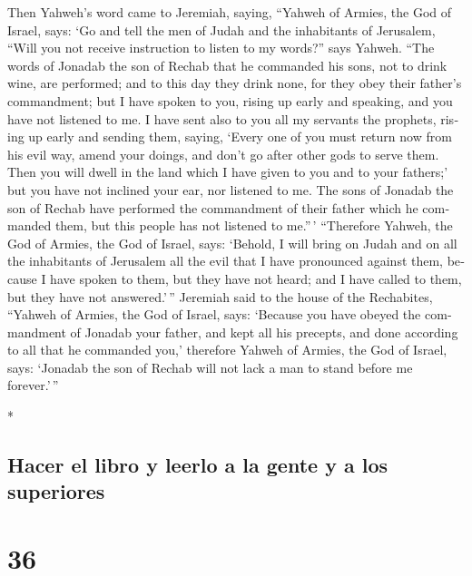 \begin{paracol}{2}
\begin{otherlanguage}{english}
 Then Yahweh's word came to Jeremiah, saying,
 ``Yahweh of Armies, the God of Israel, says: `Go and
tell the men of Judah and the inhabitants of Jerusalem, ``Will you not
receive instruction to listen to my words?'' says Yahweh.
 ``The words of Jonadab the son of Rechab that he
commanded his sons, not to drink wine, are performed; and to this day
they drink none, for they obey their father's commandment; but I have
spoken to you, rising up early and speaking, and you have not listened
to me.  I have sent also to you all my servants the
prophets, rising up early and sending them, saying, `Every one of you
must return now from his evil way, amend your doings, and don't go after
other gods to serve them. Then you will dwell in the land which I have
given to you and to your fathers;' but you have not inclined your ear,
nor listened to me.  The sons of Jonadab the son of
Rechab have performed the commandment of their father which he commanded
them, but this people has not listened to me.''\,' 
``Therefore Yahweh, the God of Armies, the God of Israel, says: `Behold,
I will bring on Judah and on all the inhabitants of Jerusalem all the
evil that I have pronounced against them, because I have spoken to them,
but they have not heard; and I have called to them, but they have not
answered.'\,''  Jeremiah said to the house of the
Rechabites, ``Yahweh of Armies, the God of Israel, says: `Because you
have obeyed the commandment of Jonadab your father, and kept all his
precepts, and done according to all that he commanded you,'
 therefore Yahweh of Armies, the God of Israel, says:
`Jonadab the son of Rechab will not lack a man to stand before me
forever.'\,''

\end{otherlanguage}

\switchcolumn[0]*

\hypertarget{hacer-el-libro-y-leerlo-a-la-gente-y-a-los-superiores}{%
\subsection{Hacer el libro y leerlo a la gente y a los
superiores}\label{hacer-el-libro-y-leerlo-a-la-gente-y-a-los-superiores}}

\hypertarget{section-70}{%
\section{36}\label{section-70}}


\end{paracol}
